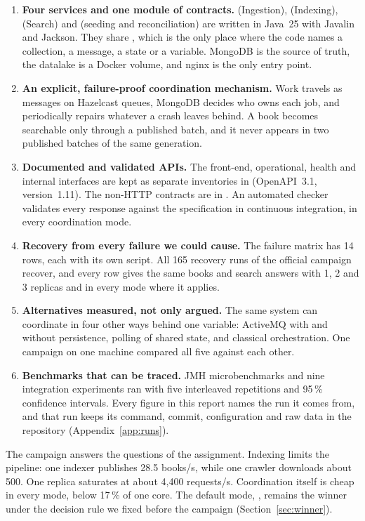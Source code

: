 \begin{enumerate}
\item \textbf{Four services and one module of contracts.}  (Ingestion),  (Indexing),
   (Search) and  (seeding and reconciliation) are written in Java~25 with Javalin and
  Jackson. They share , which is the only place where the code names a collection, a message, a state or a
  variable. MongoDB is the source of truth, the datalake is a Docker volume, and nginx is the only entry point.
\item \textbf{An explicit, failure-proof coordination mechanism.} Work travels as messages on Hazelcast queues, MongoDB
  decides who owns each job, and  periodically repairs whatever a crash leaves behind. A book becomes
  searchable only through a published batch, and it never appears in two published batches of the same generation.
\item \textbf{Documented and validated APIs.} The front-end, operational, health and internal interfaces are kept as
  separate inventories in  (OpenAPI~3.1, version~1.11). The non-HTTP contracts are in
  . An automated checker validates every response against the specification in continuous integration,
  in every coordination mode.
\item \textbf{Recovery from every failure we could cause.} The failure matrix has 14 rows, each with its own script. All
  165 recovery runs of the official campaign recover, and every row gives the same books and search answers with 1, 2
  and 3 replicas and in every mode where it applies.
\item \textbf{Alternatives measured, not only argued.} The same system can coordinate in four other ways behind one
  variable: ActiveMQ with and without persistence, polling of shared state, and classical orchestration. One campaign
  on one machine compared all five against each other.
\item \textbf{Benchmarks that can be traced.} JMH microbenchmarks and nine integration experiments ran with five
  interleaved repetitions and 95\,\% confidence intervals. Every figure in this report names the run it comes from,
  and that run keeps its command, commit, configuration and raw data in the repository (Appendix~\ref{app:runs}).
\end{enumerate}

The campaign answers the questions of the assignment. Indexing limits the pipeline: one indexer publishes 28.5
books/s, while one crawler downloads about 500. One  replica saturates at about 4{,}400 requests/s.
Coordination itself is cheap in every mode, below 17\,\% of one core. The default mode, , remains the
winner under the decision rule we fixed before the campaign (Section~\ref{sec:winner}).

